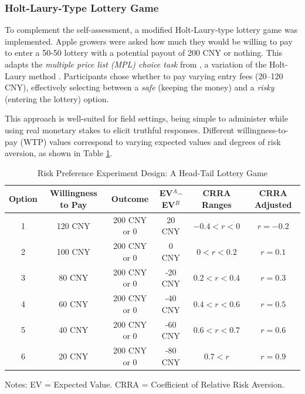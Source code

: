 \subsubsection{Holt-Laury-Type Lottery Game}  
\noindent To complement the self-assessment, a modified Holt-Laury-type lottery game was implemented. Apple growers were asked how much they would be willing to pay to enter a 50-50 lottery with a potential payout of 200 CNY or nothing. This adapts the \textit{multiple price list (MPL) choice task} from \cite{brick2012risk}, a variation of the Holt-Laury method \citep{holt2002risk}. Participants chose whether to pay varying entry fees (20–120 CNY), effectively selecting between a \textit{safe} (keeping the money) and a \textit{risky} (entering the lottery) option.  

This approach is well-suited for field settings, being simple to administer while using real monetary stakes to elicit truthful responses. Different willingness-to-pay (WTP) values correspond to varying expected values and degrees of risk aversion, as shown in Table \ref{tab:experiment_design}.  

\begin{table}[H]
    \centering
    \footnotesize 
    \caption{Risk Preference Experiment Design: A Head-Tail Lottery Game}
    \renewcommand{\arraystretch}{1.2}
    \begin{tabular}{cccccc}
        \toprule
        \textbf{Option} & \textbf{Willingness to Pay} & \textbf{Outcome} & \textbf{EV$^{A}$--EV$^{B}$} & \textbf{CRRA Ranges} & \textbf{CRRA Adjusted}\\
        \midrule
        1 & 120 CNY & 200 CNY or 0 & 20 CNY & $-0.4 < r < 0$  & $r = -0.2$\\
        2 & 100 CNY & 200 CNY or 0 & 0 CNY & $0 < r < 0.2$  & $r= 0.1$ \\
        3 & 80 CNY & 200 CNY or 0 & -20 CNY & $0.2 < r < 0.4$  & $r= 0.3$ \\
        4 & 60 CNY & 200 CNY or 0 & -40 CNY & $0.4 < r < 0.6$  & $r= 0.5$ \\
        5 & 40 CNY & 200 CNY or 0 & -60 CNY & $0.6 < r < 0.7$  & $r=0.6$ \\
        6 & 20 CNY & 200 CNY or 0 & -80 CNY & $0.7 < r$  & $r= 0.9$ \\
        \bottomrule
    \end{tabular}
    \label{tab:experiment_design}
    \vspace{0.5em}
    \small Notes: EV = Expected Value. CRRA = Coefficient of Relative Risk Aversion.
\end{table}

